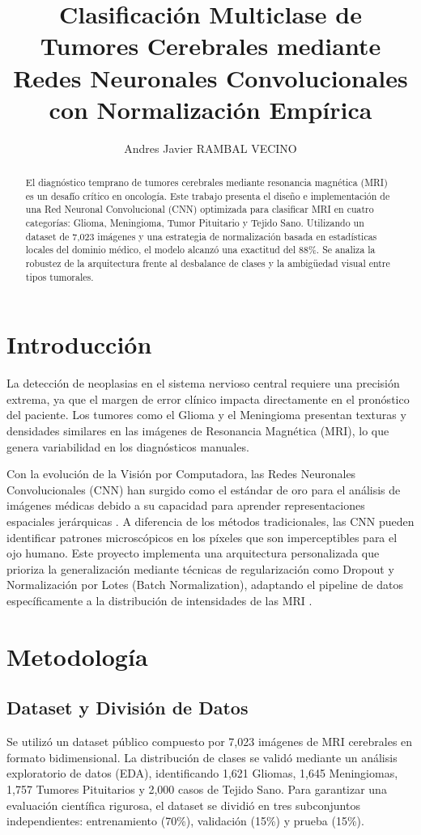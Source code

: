 \documentclass[letterpaper, 10 pt, conference]{ieeeconf}
\title{\LARGE \bf
Clasificación Multiclase de Tumores Cerebrales mediante Redes Neuronales Convolucionales con Normalización Empírica
}
\author{Andres Javier RAMBAL VECINO}
\begin{document}
\maketitle
\thispagestyle{empty}
\pagestyle{empty}

\begin{abstract}
El diagnóstico temprano de tumores cerebrales mediante resonancia magnética (MRI) es un desafío crítico en oncología. Este trabajo presenta el diseño e implementación de una Red Neuronal Convolucional (CNN) optimizada para clasificar MRI en cuatro categorías: Glioma, Meningioma, Tumor Pituitario y Tejido Sano. Utilizando un dataset de 7,023 imágenes y una estrategia de normalización basada en estadísticas locales del dominio médico, el modelo alcanzó una exactitud del 88\%. Se analiza la robustez de la arquitectura frente al desbalance de clases y la ambigüedad visual entre tipos tumorales.
\end{abstract}

\section{Introducción}
La detección de neoplasias en el sistema nervioso central requiere una precisión extrema, ya que el margen de error clínico impacta directamente en el pronóstico del paciente. Los tumores como el Glioma y el Meningioma presentan texturas y densidades similares en las imágenes de Resonancia Magnética (MRI), lo que genera variabilidad en los diagnósticos manuales.

Con la evolución de la Visión por Computadora, las Redes Neuronales Convolucionales (CNN) han surgido como el estándar de oro para el análisis de imágenes médicas debido a su capacidad para aprender representaciones espaciales jerárquicas \cite{c1}. A diferencia de los métodos tradicionales, las CNN pueden identificar patrones microscópicos en los píxeles que son imperceptibles para el ojo humano. Este proyecto implementa una arquitectura personalizada que prioriza la generalización mediante técnicas de regularización como Dropout y Normalización por Lotes (Batch Normalization), adaptando el pipeline de datos específicamente a la distribución de intensidades de las MRI \cite{c2}.

\section{Metodología}

\subsection{Dataset y División de Datos}
Se utilizó un dataset público compuesto por 7,023 imágenes de MRI cerebrales en formato bidimensional. La distribución de clases se validó mediante un análisis exploratorio de datos (EDA), identificando 1,621 Gliomas, 1,645 Meningiomas, 1,757 Tumores Pituitarios y 2,000 casos de Tejido Sano. Para garantizar una evaluación científica rigurosa, el dataset se dividió en tres subconjuntos independientes: entrenamiento (70\%), validación (15\%) y prueba (15\%).
\end{document}
